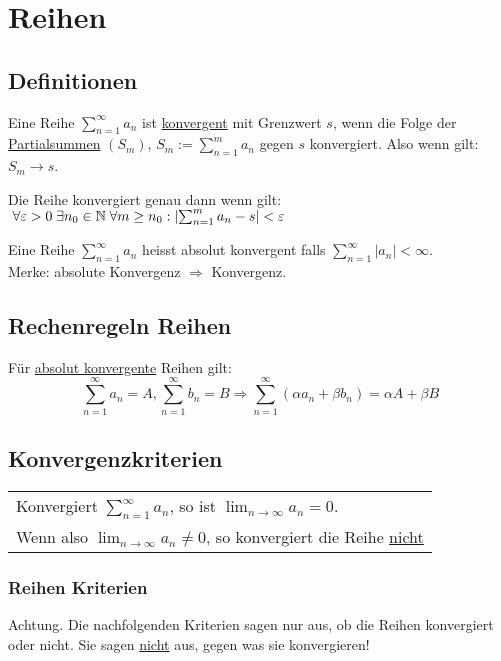 \section{Reihen}

\subsection{Definitionen}
Eine Reihe $\sum_{n = 1}^\infty a_n$ ist \underline{konvergent} mit Grenzwert
$s$, wenn die Folge der \underline{Partialsummen} $(S_m)$, $S_m :=
\sum_{n=1}^m a_n$ gegen $s$ konvergiert. Also wenn gilt: $S_m \to s$.

\begin{definition} Die Reihe konvergiert genau dann wenn gilt:
	$\; \forall \varepsilon > 0 \; \exists n_0 \in \mathbb{N} \; \forall m \geq n_0: \left|
	\sum_{n=1}^m a_n - s \right| < \varepsilon$
\end{definition}

\begin{definition}
Eine Reihe $\sum_{n=1}^\infty a_n$ heisst absolut konvergent falls $\sum_{n=1}^\infty |a_n| < \infty$. \\
Merke: absolute Konvergenz $\Rightarrow$ Konvergenz.
\end{definition}

\subsection{Rechenregeln Reihen}
Für \underline{absolut konvergente} Reihen gilt:
\[
	\sum_{n=1}^\infty a_n = A, \sum_{n=1}^\infty b_n = B \Rightarrow
	\sum_{n=1}^\infty (\alpha a_n + \beta b_n) = \alpha A + \beta B
\]

\subsection{Konvergenzkriterien}
\begin{tabular}{|l|}
\hline
	Konvergiert $\sum_{n=1}^\infty a_n$, so ist $\lim_{n \to \infty} a_n = 0$.\\
	Wenn also $\lim_{n \to \infty} a_n \neq 0$, so konvergiert die Reihe
	\underline{nicht}\\
\hline
\end{tabular}

\subsubsection{Reihen Kriterien}
Achtung. Die nachfolgenden Kriterien sagen nur aus, ob die Reihen konvergiert
oder nicht. Sie sagen \underline{nicht} aus, gegen was sie konvergieren!

